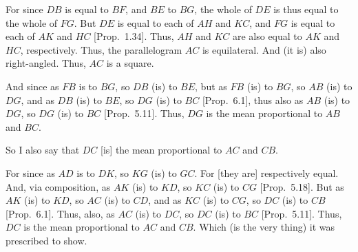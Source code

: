 \begin{Parallel}{}{}
{For since $DB$ is equal to $BF$, and $BE$ to $BG$, the whole of $DE$
is thus equal to the whole of $FG$. But $DE$ is equal to each of $AH$
and $KC$, and $FG$ is equal to each of $AK$ and $HC$ [Prop.~1.34]. Thus, $AH$ and $KC$ are also 
equal to  $AK$ and $HC$, respectively. Thus, the parallelogram $AC$
is equilateral. And (it is) also right-angled. Thus, $AC$ is a square.

And since as $FB$ is to $BG$, so $DB$ (is) to $BE$, but as $FB$
(is) to $BG$, so $AB$ (is) to $DG$, and as $DB$ (is) to $BE$, so
$DG$ (is) to $BC$ [Prop.~6.1], thus also as $AB$ (is) to $DG$, so $DG$  (is) to $BC$ [Prop.~5.11]. Thus, $DG$ is the mean proportional
to $AB$ and $BC$.

So I also say that $DC$ [is] the mean proportional to $AC$ and $CB$.

\epsfysize=1.7in
\centerline{}

For since as $AD$ is to $DK$, so $KG$ (is) to $GC$. For [they are]  respectively equal. And, via composition, as $AK$ (is) to $KD$, so
$KC$ (is) to $CG$ [Prop.~5.18]. But as
$AK$ (is) to $KD$, so $AC$ (is) to $CD$, and as $KC$ (is) to $CG$,
so $DC$ (is) to $CB$ [Prop.~6.1]. Thus, also, as $AC$ (is) to $DC$, so
$DC$ (is) to $BC$ [Prop.~5.11]. Thus, $DC$ is the mean proportional to $AC$ and
$CB$. Which (is the very thing) it was prescribed to show.}
\end{Parallel}

